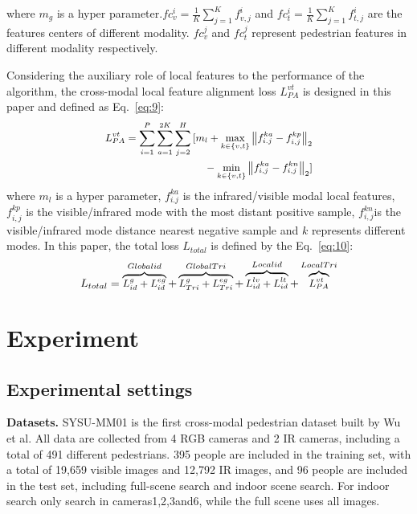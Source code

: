 \documentclass[journal]{IEEEtran}
\begin{document}
where ${m_g}$ is a hyper parameter.$fc_v^i = \frac{1}{K}\sum\nolimits_{j = 1}^K {f_{v,j}^i}$ and $fc_t^i = \frac{1}{K}\sum\nolimits_{j = 1}^K {f_{t,j}^i}$ are the features centers of different modality. $fc_v^j$ and $fc_t^j$ represent pedestrian features in different modality respectively.

Considering the auxiliary role of local features to the performance of the algorithm, the cross-modal local feature alignment loss $L_{PA}^{vt}$ is designed in this paper and defined as Eq.~\ref{eq:9}:
\begin{equation}
	\small
	\label{eq:9}
	\begin{aligned}	
	L_{PA}^{vt} = \sum\limits_{i = 1}^P {\sum\limits_{a = 1}^{2K} {\sum\limits_{j = 2}^H {[{m_l} + \mathop {\max }\limits_{k \in \{ v,t\} } {{\left\| {f_{i.j}^{ka} - f_{i,j}^{kp}} \right\|}_2}} } }&\\
	{\rm{ }} - \mathop {\min }\limits_{k \in \{ v,t\} } {\left\| {f_{i,j}^{ka} - f_{i,j}^{kn}} \right\|_2}]&	
\end{aligned}
\end{equation}
where ${m_l}$ is a hyper parameter, $f_{i.j}^{ka}$ is the infrared/visible modal local features, $f_{i,j}^{kp}$ is the visible/infrared mode with the most distant positive sample, $f_{i,j}^{kn}$is the visible/infrared mode  distance nearest negative sample and $k$ represents different modes.
In this paper, the total loss ${L_{total}}$ is defined by the Eq.~\ref{eq:10}:
\begin{equation}
	\small
	\label{eq:10}
	{L_{total}} = \overbrace {L_{id}^g + L_{id}^{eg}}^{Global{\rm{ }}id} + \overbrace {L_{Tri}^g + L_{Tri}^{eg}}^{Global{\rm{ }}Tri} + \overbrace {L_{id}^{lv} + L_{id}^{lt}}^{Local{\rm{ }}id} + \overbrace {L_{PA}^{vt}}^{Local{\rm{ }}Tri}
\end{equation}

\section{Experiment}
\label{section4}
\subsection{Experimental settings}
\textbf{Datasets.} 
SYSU-MM01 is the first cross-modal pedestrian dataset built by Wu et al. All data are collected from 4 RGB cameras and 2 IR cameras, including a total of 491 different pedestrians. 395 people are included in the training set, with a total of 19,659 visible images and 12,792 IR images, and 96 people are included in the test set, including full-scene search and indoor scene search. For indoor search only search in cameras1,2,3and6, while the full scene uses all images.
\end{document}
